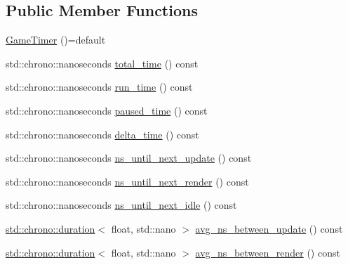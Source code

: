 \subsection*{Public Member Functions}
\begin{DoxyCompactItemize}
\item 
\hyperlink{class_game_timer_a8fadf802cd6f60fd3466fed3a890c64d_a8fadf802cd6f60fd3466fed3a890c64d}{Game\+Timer} ()=default
\item 
std\+::chrono\+::nanoseconds \hyperlink{class_game_timer_a1fe9ed75535944c51ce2deeee90fa9e9_a1fe9ed75535944c51ce2deeee90fa9e9}{total\+\_\+time} () const 
\item 
std\+::chrono\+::nanoseconds \hyperlink{class_game_timer_a92fc929a7aef200fe39ebc31edfaa24e_a92fc929a7aef200fe39ebc31edfaa24e}{run\+\_\+time} () const 
\item 
std\+::chrono\+::nanoseconds \hyperlink{class_game_timer_a0f6e16d44a9fd01b5b63a36c4df3f04b_a0f6e16d44a9fd01b5b63a36c4df3f04b}{paused\+\_\+time} () const 
\item 
std\+::chrono\+::nanoseconds \hyperlink{class_game_timer_a70ab8ec146f451278051054131ccbb00_a70ab8ec146f451278051054131ccbb00}{delta\+\_\+time} () const 
\item 
std\+::chrono\+::nanoseconds \hyperlink{class_game_timer_a111d910c595648c28cf6fe6cb6151301_a111d910c595648c28cf6fe6cb6151301}{ns\+\_\+until\+\_\+next\+\_\+update} () const 
\item 
std\+::chrono\+::nanoseconds \hyperlink{class_game_timer_a7fd18be5e0dd4f5fa8da0b78755e4353_a7fd18be5e0dd4f5fa8da0b78755e4353}{ns\+\_\+until\+\_\+next\+\_\+render} () const 
\item 
std\+::chrono\+::nanoseconds \hyperlink{class_game_timer_a8bfc43723bdfd30d2c6bd780c8976a68_a8bfc43723bdfd30d2c6bd780c8976a68}{ns\+\_\+until\+\_\+next\+\_\+idle} () const 
\item 
\hyperlink{_game_timer_8hpp_ab009df19aad3a6ab5be3c7e2f740f737_ab009df19aad3a6ab5be3c7e2f740f737}{std\+::chrono\+::duration}$<$ float, std\+::nano $>$ \hyperlink{class_game_timer_a0bb71bebfcf4eecd9cff54e566d07bee_a0bb71bebfcf4eecd9cff54e566d07bee}{avg\+\_\+ns\+\_\+between\+\_\+update} () const 
\item 
\hyperlink{_game_timer_8hpp_ab009df19aad3a6ab5be3c7e2f740f737_ab009df19aad3a6ab5be3c7e2f740f737}{std\+::chrono\+::duration}$<$ float, std\+::nano $>$ \hyperlink{class_game_timer_a60968291db34364580f524b553b85bd1_a60968291db34364580f524b553b85bd1}{avg\+\_\+ns\+\_\+between\+\_\+render} () const 
\item 

\end{DoxyCompactItemize}
